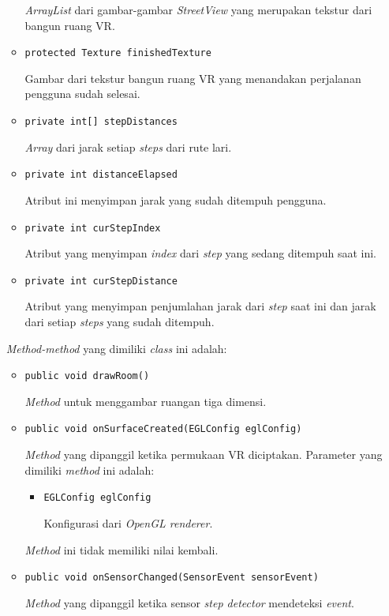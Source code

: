 \begin{enumerate}
\begin{itemize}
		\textit{ArrayList} dari gambar-gambar \textit{StreetView} yang merupakan tekstur dari bangun ruang VR.
		\item \texttt{protected Texture finishedTexture}
		
		Gambar dari tekstur bangun ruang VR yang menandakan perjalanan pengguna sudah selesai.

		\item \texttt{private int[] stepDistances}		
		
		\textit{Array} dari jarak setiap \textit{steps} dari rute lari.	
		\item \texttt{private int distanceElapsed}
		
		Atribut ini menyimpan jarak yang sudah ditempuh pengguna.
		\item \texttt{private int curStepIndex}
		
		Atribut yang menyimpan \textit{index} dari \textit{step} yang sedang ditempuh saat ini.
		\item \texttt{private int curStepDistance}

		Atribut yang menyimpan penjumlahan jarak dari \textit{step} saat ini dan jarak dari setiap \textit{steps} yang sudah ditempuh.		
	\end{itemize}
	
	\textit{Method-method} yang dimiliki \textit{class} ini adalah:
	
		\begin{itemize}
			\item \texttt{public void drawRoom()}
			
			\textit{Method} untuk menggambar ruangan tiga dimensi.
			\item \texttt{public void onSurfaceCreated(EGLConfig eglConfig)}
			
			\textit{Method} yang dipanggil ketika permukaan VR diciptakan. Parameter yang dimiliki \textit{method} ini adalah:
			
			\begin{itemize}
				\item \texttt{EGLConfig eglConfig}
				
			Konfigurasi dari  \textit{OpenGL renderer}. 				
			\end{itemize}
		
		\textit{Method} ini tidak memiliki nilai kembali.
		\item \texttt{public void onSensorChanged(SensorEvent sensorEvent)}
		
		\textit{Method} yang dipanggil ketika sensor \textit{step detector} mendeteksi \textit{event}.	
		\end{itemize}
	

\end{enumerate}
